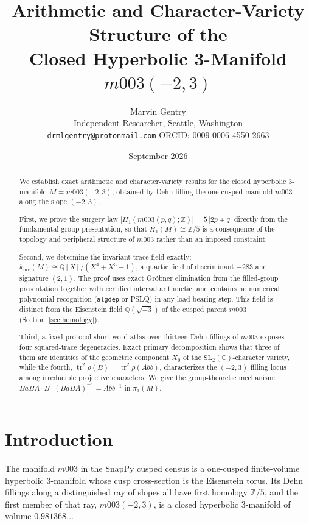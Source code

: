 \documentclass[11pt,a4paper]{article}
\title{Arithmetic and Character-Variety Structure of the\\
Closed Hyperbolic 3-Manifold $m003(-2,3)$}
\author{Marvin Gentry\\
\small Independent Researcher, Seattle, Washington\\
\small \texttt{drmlgentry@protonmail.com} \quad ORCID: 0009-0006-4550-2663}
\date{September 2026}
\theoremstyle{definition}
\theoremstyle{remark}
\newcommand{\tr}{\operatorname{tr}}
\newcommand{\kinv}{k_{\mathrm{inv}}}
\newcommand{\SLtwo}{\mathrm{SL}_2(\mathbb{C})}
\newcommand{\Zfive}{\mathbb{Z}/5}
\newcommand{\Q}{\mathbb{Q}}
\newcommand{\Z}{\mathbb{Z}}
\begin{document}
\maketitle

\begin{abstract}
We establish exact arithmetic and character-variety results for the closed
hyperbolic 3-manifold $M = m003(-2,3)$, obtained by Dehn filling the
one-cusped manifold $m003$ along the slope $(-2,3)$.

First, we prove the surgery law
$|H_1(m003(p,q);\Z)| = 5\,|2p+q|$
directly from the fundamental-group presentation, so that
$H_1(M) \cong \Zfive$ is a consequence of the topology and peripheral
structure of $m003$ rather than an imposed constraint.

Second, we determine the invariant trace field exactly:
$\kinv(M) \cong \Q[X]/(X^4+X^3-1)$,
a quartic field of discriminant $-283$ and signature $(2,1)$.
The proof uses exact Gr\"obner elimination from the filled-group
presentation together with certified interval arithmetic, and
contains no numerical polynomial recognition (\texttt{algdep} or PSLQ)
in any load-bearing step. This field is distinct from the Eisenstein
field $\Q(\sqrt{-3})$ of the cusped parent $m003$ (Section~\ref{sec:homology}).

Third, a fixed-protocol short-word atlas over thirteen
Dehn fillings of $m003$ exposes four squared-trace degeneracies.
Exact primary decomposition shows that three of them are identities
of the geometric component $X_0$ of the $\SLtwo$-character variety,
while the fourth,
$\tr^2 \rho(B) = \tr^2 \rho(Abb)$,
characterizes the $(-2,3)$ filling locus among irreducible projective
characters. We give the group-theoretic mechanism:
$BaBA \cdot B \cdot (BaBA)^{-1} = Abb^{-1}$ in $\pi_1(M)$.
\end{abstract}

\tableofcontents

\section{Introduction}

The manifold $m003$ in the SnapPy cusped census \cite{SnapPy} is a one-cusped
finite-volume hyperbolic 3-manifold whose cusp cross-section is the
Eisenstein torus. Its Dehn fillings along a distinguished ray of slopes
all have first homology $\Zfive$, and the first member of that ray,
$m003(-2,3)$, is a closed hyperbolic 3-manifold of volume
$0.981368\ldots$
\end{document}
